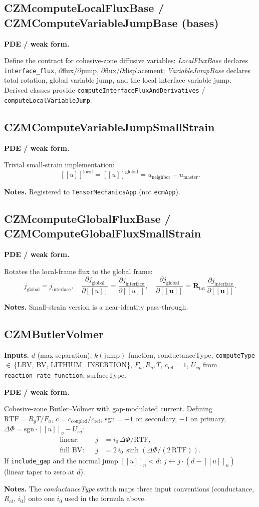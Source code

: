\documentclass[11pt]{article}
\newcommand{\F}{F_{\!a}}            %
\newcommand{\Rg}{R_{\!g}}           %
\newcommand{\sgn}{\mathrm{sgn}}
\newenvironment{ecmEntry}[1]{%
  \subsection{#1}%
}{}
\newcommand{\inputsRow}[1]{\par\noindent\textbf{Inputs.} #1\par}
\newcommand{\pdeRow}[1]{\par\noindent\textbf{PDE / weak form.}\par #1\par}
\newcommand{\notesRow}[1]{\par\noindent\textbf{Notes.} #1\par}
\begin{document}
\begin{ecmEntry}{CZMcomputeLocalFluxBase / CZMComputeVariableJumpBase (bases)}
\pdeRow{Define the contract for cohesive-zone diffusive variables: \emph{LocalFluxBase}
declares \texttt{interface\_flux}, $\partial$flux/$\partial$jump, $\partial$flux/$\partial$displacement;
\emph{VariableJumpBase} declares total rotation, global variable jump, and the local
interface variable jump. Derived classes provide
\texttt{computeInterfaceFluxAndDerivatives} / \texttt{computeLocalVariableJump}.}
\end{ecmEntry}

\begin{ecmEntry}{CZMComputeVariableJumpSmallStrain}
\pdeRow{Trivial small-strain implementation:
\[
  [\![u]\!]^{\text{local}} = [\![u]\!]^{\text{global}} = u_{\text{neighbor}} - u_{\text{master}}.
\]}
\notesRow{Registered to \texttt{TensorMechanicsApp} (not \texttt{ecmApp}).}
\end{ecmEntry}

\begin{ecmEntry}{CZMcomputeGlobalFluxBase / CZMComputeGlobalFluxSmallStrain}
\pdeRow{Rotates the local-frame flux to the global frame:
\[
  j_{\text{global}} = j_{\text{interface}}, \quad
  \frac{\partial j_{\text{global}}}{\partial[\![u]\!]} = \frac{\partial j_{\text{interface}}}{\partial[\![u]\!]},\quad
  \frac{\partial j_{\text{global}}}{\partial[\![\bm{u}]\!]} = \bm{R}_{\text{tot}}\,\frac{\partial j_{\text{interface}}}{\partial[\![\bm{u}]\!]}.
\]}
\notesRow{Small-strain version is a near-identity pass-through.}
\end{ecmEntry}

\begin{ecmEntry}{CZMButlerVolmer}
\inputsRow{$d$ (max separation), $k(\text{jump})$ function, conductanceType,
\texttt{computeType}\,$\in$\,\{LBV, BV, LITHIUM\_INSERTION\}, $\F,\Rg,T$, $c_{\text{ref}}=1$,
$U_{eq}$ from \texttt{reaction\_rate\_function}, surfaceType.}
\pdeRow{Cohesive-zone Butler--Volmer with gap-modulated current. Defining
$\mathrm{RTF}=\Rg T/\F$, $\bar c = c_{\text{coupled}}/c_{\text{ref}}$,
$\sgn = +1$ on secondary, $-1$ on primary, $\Delta\Phi=\sgn\cdot[\![u]\!]_v - U_{eq}$:
\[
\begin{aligned}
\text{linear:} && j &= i_0\,\Delta\Phi/\mathrm{RTF},\\
\text{full BV:} && j &= 2\,i_0\,\sinh(\Delta\Phi/(2\,\mathrm{RTF})).
\end{aligned}
\]
If \texttt{include\_gap} and the normal jump $[\![u]\!]_n < d$:
$j \leftarrow j\cdot(d - [\![u]\!]_n)$ (linear taper to zero at $d$).}
\notesRow{The \emph{conductanceType} switch maps three input conventions
(conductance, $R_{ct}$, $i_0$) onto one $i_0$ used in the formula above.}
\end{ecmEntry}
\end{document}
